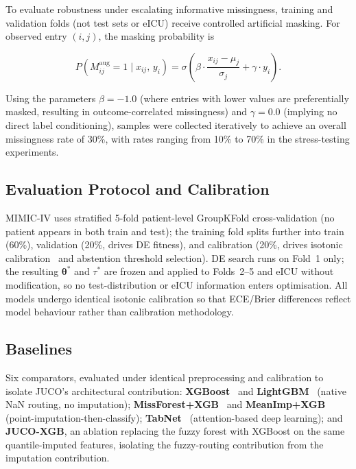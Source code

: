 \documentclass[journal]{IEEEtran}
\begin{document}
	To evaluate robustness under escalating informative missingness, training and validation folds (not test sets or eICU) receive controlled artificial masking. For observed entry $(i,j)$, the masking probability is
	
	\begin{equation}
		P\!\left(M_{ij}^{\text{aug}}=1\mid x_{ij},\,y_i\right)
		=\sigma\!\left(
		\beta\cdot\frac{x_{ij}-\mu_j}{\sigma_j}
		+\gamma\cdot y_i
		\right).
		\label{eq:mnar_mask}
	\end{equation}
	
	Using the parameters $\beta=-1.0$ (where entries with lower values are preferentially masked, resulting in outcome-correlated missingness) and $\gamma=0.0$ (implying no direct label conditioning), samples were collected iteratively to achieve an overall missingness rate of 30\%, with rates ranging from 10\% to 70\% in the stress-testing experiments.
	
	\subsection{Evaluation Protocol and Calibration}
	\label{sec:evaluation_protocol}
	\label{sec:calibration}
	
	MIMIC-IV uses stratified 5-fold patient-level GroupKFold cross-validation (no patient appears in both train and test); the training fold splits further into train (60\%), validation (20\%, drives DE fitness), and calibration (20\%, drives isotonic calibration~\cite{zadrozny2002transforming} and abstention threshold selection). DE search runs on Fold~1 only; the resulting $\boldsymbol{\theta}^*$ and $\tau^*$ are frozen and applied to Folds~2--5 and eICU without modification, so no test-distribution or eICU information enters optimisation. All models undergo identical isotonic calibration so that ECE/Brier differences reflect model behaviour rather than calibration methodology.
	
	\subsection{Baselines}
	\label{sec:baselines}
	
	Six comparators, evaluated under identical preprocessing and calibration to isolate JUCO's architectural contribution: \textbf{XGBoost}~\cite{chen2016xgboost} and \textbf{LightGBM}~\cite{ke2017lightgbm} (native NaN routing, no imputation); \textbf{MissForest+XGB}~\cite{stekhoven2012missforest} and \textbf{MeanImp+XGB} (point-imputation-then-classify); \textbf{TabNet}~\cite{arik2021tabnet} (attention-based deep learning); and \textbf{JUCO-XGB}, an ablation replacing the fuzzy forest with XGBoost on the same quantile-imputed features, isolating the fuzzy-routing contribution from the imputation contribution.
	
\end{document}
